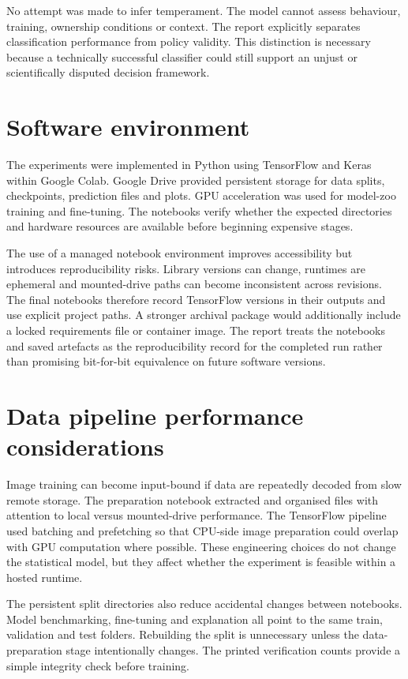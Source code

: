 No attempt was made to infer temperament. The model cannot assess behaviour, training, ownership conditions or context. The report explicitly separates classification performance from policy validity. This distinction is necessary because a technically successful classifier could still support an unjust or scientifically disputed decision framework.

\section{Software environment}
The experiments were implemented in Python using TensorFlow and Keras within Google Colab. Google Drive provided persistent storage for data splits, checkpoints, prediction files and plots. GPU acceleration was used for model-zoo training and fine-tuning. The notebooks verify whether the expected directories and hardware resources are available before beginning expensive stages.

The use of a managed notebook environment improves accessibility but introduces reproducibility risks. Library versions can change, runtimes are ephemeral and mounted-drive paths can become inconsistent across revisions. The final notebooks therefore record TensorFlow versions in their outputs and use explicit project paths. A stronger archival package would additionally include a locked requirements file or container image. The report treats the notebooks and saved artefacts as the reproducibility record for the completed run rather than promising bit-for-bit equivalence on future software versions.

\section{Data pipeline performance considerations}
Image training can become input-bound if data are repeatedly decoded from slow remote storage. The preparation notebook extracted and organised files with attention to local versus mounted-drive performance. The TensorFlow pipeline used batching and prefetching so that CPU-side image preparation could overlap with GPU computation where possible. These engineering choices do not change the statistical model, but they affect whether the experiment is feasible within a hosted runtime.

The persistent split directories also reduce accidental changes between notebooks. Model benchmarking, fine-tuning and explanation all point to the same train, validation and test folders. Rebuilding the split is unnecessary unless the data-preparation stage intentionally changes. The printed verification counts provide a simple integrity check before training.

